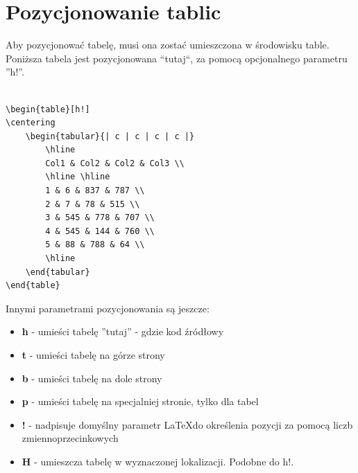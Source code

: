 \documentclass[table]{beamer}
\begin{document}
\section{Pozycjonowanie tablic}
\begin{frame}[fragile]
Aby pozycjonować tabelę, musi ona zostać umieszczona w środowisku table. Poniższa tabela jest pozycjonowana ``tutaj``, za pomocą opcjonalnego parametru ''h!''.
{\small
\begin{lstlisting}

\begin{table}[h!]
\centering
	\begin{tabular}{| c | c | c | c |} 
 		\hline
 		Col1 & Col2 & Col2 & Col3 \\ 
 		\hline \hline
 		1 & 6 & 837 & 787 \\ 
		2 & 7 & 78 & 515 \\
 		3 & 545 & 778 & 707 \\
 		4 & 545 & 144 & 760 \\
 		5 & 88 & 788 & 64 \\ 
 		\hline
 	\end{tabular}
\end{table}

\end{lstlisting}
}
\end{frame}

\begin{frame}

Innymi parametrami pozycjonowania są jeszcze:
\begin{itemize}
	\item \textbf{h} - umieści tabelę ''tutaj'' - gdzie kod źródłowy
	\item \textbf{t} - umieści tabelę na górze strony
	\item \textbf{b} - umieści tabelę na dole strony
	\item \textbf{p} - umieści tabelę na specjalniej stronie, tylko dla tabel
	\item \textbf{!} - nadpisuje domyślny parametr \LaTeX do określenia pozycji za pomocą liczb zmiennoprzecinkowych
	\item \textbf{H} - umieszcza tabelę w wyznaczonej lokalizacji. Podobne do h!.
\end{itemize}

\end{frame}
\end{document}
